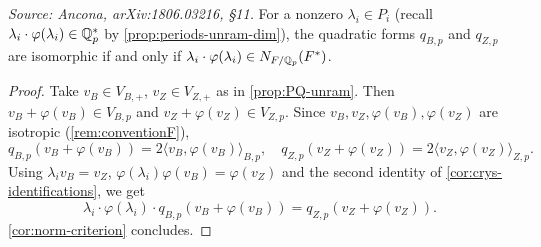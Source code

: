 \begin{proposition}
  \label{prop:iso-norm-unram}
  \textit{Source: Ancona, arXiv:1806.03216, \S11.}
  For a nonzero \(\lambda_i \in P_i\) (recall
  \(\lambda_i \cdot \varphi(\lambda_i) \in \mathbb{Q}_p^*\) by
  \cref{prop:periods-unram-dim}), the quadratic forms \(q_{B,p}\) and
  \(q_{Z,p}\) are isomorphic if and only if
  \(\lambda_i \cdot \varphi(\lambda_i) \in N_{F/\mathbb{Q}_p}(F^*)\).
\end{proposition}

\begin{proof}
  Take \(v_B \in V_{B,+}\), \(v_Z \in V_{Z,+}\) as in
  \cref{prop:PQ-unram}. Then \(v_B + \varphi(v_B) \in V_{B,p}\) and
  \(v_Z + \varphi(v_Z) \in V_{Z,p}\). Since \(v_B, v_Z, \varphi(v_B),
  \varphi(v_Z)\) are isotropic (\cref{rem:conventionF}),
  \[q_{B,p}(v_B + \varphi(v_B)) = 2\langle v_B, \varphi(v_B)\rangle_{B,p}, \quad
    q_{Z,p}(v_Z + \varphi(v_Z)) = 2\langle v_Z, \varphi(v_Z)\rangle_{Z,p}.\]
  Using \(\lambda_i v_B = v_Z\), \(\varphi(\lambda_i)\varphi(v_B) = \varphi(v_Z)\)
  and the second identity of \cref{cor:crys-identifications}, we get
  \[\lambda_i \cdot \varphi(\lambda_i) \cdot q_{B,p}(v_B + \varphi(v_B)) =
    q_{Z,p}(v_Z + \varphi(v_Z)).\]
  \cref{cor:norm-criterion} concludes.
\end{proof}

